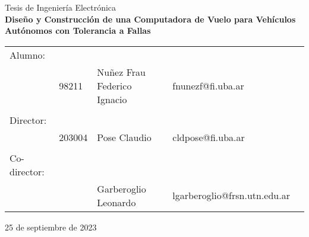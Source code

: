 \newcommand{\HRule}{\rule{\linewidth}{0.5mm}}
\begin{center}
{\LARGE Tesis de Ingeniería Electrónica}\\[0.5cm]
\textbf{\Large Diseño y Construcción de una Computadora de Vuelo para Vehículos Autónomos con Tolerancia a Fallas}\\[0.6cm]
\end{center}

\begin{center}
        \begin{tabular}{lllll}
                Alumno: & & & & \\
                        & 98211 & Nuñez Frau Federico Ignacio & fnunezf@fi.uba.ar & %
                        \\
                & & & & \\
                Director: & & & & \\
                & 203004 & Pose Claudio & cldpose@fi.uba.ar & %
                \\ 
                & & & & \\
                Co-director: & & & & \\
                & %
                & Garberoglio Leonardo & lgarberoglio@frsn.utn.edu.ar & %
                \\ 
        \end{tabular}
\end{center}

\vspace{0.3cm}

\begin{center}
        25 de septiembre de 2023
\end{center}

\vspace{1.0cm}
